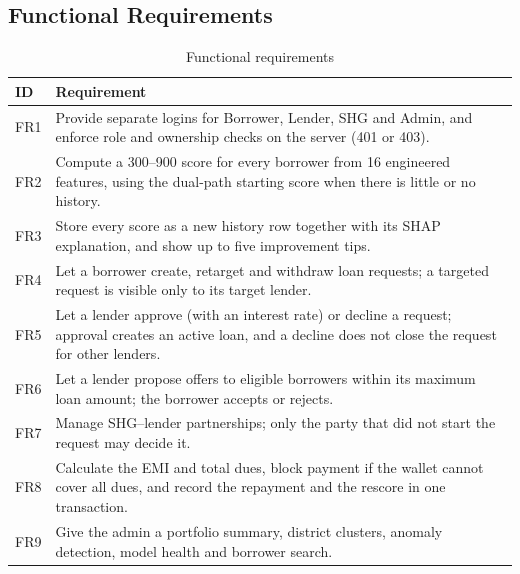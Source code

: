 \documentclass[11pt,a4paper]{article}
\begin{document}
\subsection{Functional Requirements}
\begin{table}[H]
\centering
\caption{Functional requirements}
\label{tab:fr}
\small
\begin{tabular}{@{}lL{13.2cm}@{}}
\toprule
\textbf{ID} & \textbf{Requirement}\\
\midrule
FR1 & Provide separate logins for Borrower, Lender, SHG and Admin, and enforce role and ownership checks on the server (401 or 403).\\
FR2 & Compute a 300--900 score for every borrower from 16 engineered features, using the dual-path starting score when there is little or no history.\\
FR3 & Store every score as a new history row together with its SHAP explanation, and show up to five improvement tips.\\
FR4 & Let a borrower create, retarget and withdraw loan requests; a targeted request is visible only to its target lender.\\
FR5 & Let a lender approve (with an interest rate) or decline a request; approval creates an active loan, and a decline does not close the request for other lenders.\\
FR6 & Let a lender propose offers to eligible borrowers within its maximum loan amount; the borrower accepts or rejects.\\
FR7 & Manage SHG--lender partnerships; only the party that did not start the request may decide it.\\
FR8 & Calculate the EMI and total dues, block payment if the wallet cannot cover all dues, and record the repayment and the rescore in one transaction.\\
FR9 & Give the admin a portfolio summary, district clusters, anomaly detection, model health and borrower search.\\
\bottomrule
\end{tabular}
\end{table}
\end{document}
